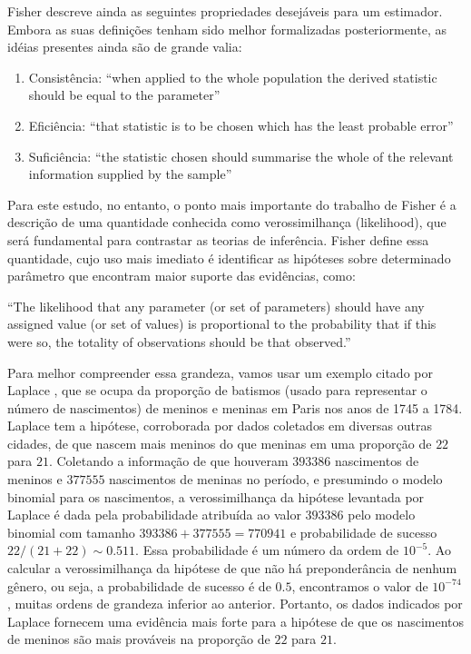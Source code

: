 \documentclass[12pt,a4paper]{article}
\begin{document}
Fisher descreve ainda as seguintes propriedades desejáveis para um estimador. Embora as suas definições tenham sido
melhor formalizadas posteriormente, as idéias presentes ainda são de grande valia:
\begin{enumerate}
	\item Consistência: ``when applied to the whole population the derived statistic should be equal to the parameter''
	\item Eficiência: ``that statistic is to be chosen which has the least probable error''
	\item Suficiência: ``the statistic chosen should summarise the whole of the relevant information supplied by the sample''
\end{enumerate}

Para este estudo, no entanto, o ponto mais importante do trabalho de Fisher é a descrição de uma quantidade conhecida como
verossimilhança (likelihood), que será fundamental para contrastar as teorias de inferência. Fisher define essa quantidade,
cujo uso mais imediato é identificar as hipóteses sobre determinado parâmetro que encontram maior suporte das evidências,
como:

``The likelihood that any parameter (or set of parameters) should have
any assigned value (or set of values) is proportional to the probability
that if this were so, the totality of observations should be that observed.''\cite{Fisher1922}

Para melhor compreender essa grandeza, vamos usar um exemplo citado por Laplace \cite{Laplace1814}, que se ocupa da 
proporção de batismos (usado para representar o número de nascimentos) de meninos e meninas em Paris nos anos 
de 1745 a 1784. Laplace tem a hipótese, corroborada por dados coletados em diversas outras cidades, de que nascem mais meninos
do que meninas em uma proporção de $22$ para $21$. Coletando a informação de que houveram $393386$ nascimentos de 
meninos e $377555$
nascimentos de meninas no período, e presumindo o modelo binomial para os nascimentos, a verossimilhança da hipótese levantada
por Laplace é dada pela probabilidade atribuída ao valor $393386$ pelo modelo binomial com tamanho $393386 + 377555 = 770941$
e probabilidade de sucesso $22/(21+22) \sim 0.511$. Essa probabilidade é um número da ordem de $10^{-5}$. Ao calcular a 
verossimilhança da hipótese de que não há preponderância de nenhum gênero, ou seja, a probabilidade de sucesso é de $0.5$, 
encontramos o valor de $10^{-74}$, muitas ordens de grandeza inferior ao anterior. Portanto, os dados indicados por Laplace
fornecem uma evidência mais forte para a hipótese de que os nascimentos de meninos são mais prováveis na proporção de $22$
para $21$.
\end{document}
